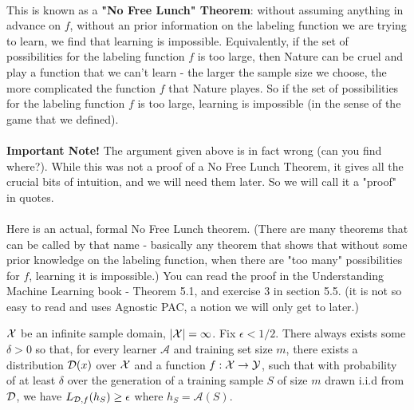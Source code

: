 \documentclass[11pt]{article}
\newcommand{\Ac}{\mathcal{A}}
\newcommand{\Hc}{\mathcal{H}}
\begin{document}
~\\
This is known as a {\bf "No Free Lunch" Theorem}: without assuming anything in advance on $f$, without an prior information on the labeling function we are trying to learn, we find that learning is impossible. Equivalently, if the set of possibilities for the labeling function $f$ is too large, then Nature can be cruel and play a function that we can't learn - the larger the sample size we choose, the more complicated the function $f$ that Nature playes. So if the set of possibilities for the labeling function $f$ is too large, learning is impossible (in the sense of the game that we defined).
\\~\\
{\bf Important Note!} The argument given above is in fact wrong (can you find where?). While this was not a proof of a No Free Lunch Theorem, it gives all the crucial bits of intuition, and we will need them later. So we will call it a "proof" in quotes. 
\\~\\
Here is an actual, formal No Free Lunch theorem. (There are many theorems that can be called by that name - basically any theorem that shows that without some prior knowledge on the labeling function, when there are "too many" possibilities for $f$, learning it is impossible.) You can read the proof in  the Understanding Machine Learning book - Theorem 5.1, and exercise 3 in section 5.5. (it is not so easy to read and uses Agnostic PAC, a notion we will only get to later.) 


\begin{theorem}
 $\mathcal{X}$ be an infinite sample domain, $|\mathcal{X}|=\infty$. Fix $\epsilon < 1/2$. There always exists some $\delta>0$ so that, for every learner $\Ac$ and training set size $m$, there exists a distribution $\mathcal{D}(x)$ over $\mathcal{X}$ and a function  $f:\mathcal{X}\to\mathcal{Y}$, such that with probability of at least $\delta$ over the generation of a training sample $S$ of size $m$ drawn i.i.d from $\mathcal{D}$, we have
   $L_{\mathcal{D},f}(h_S) \ge \epsilon$ where $h_S=\Ac(S)$.
\end{theorem}

\end{document}
